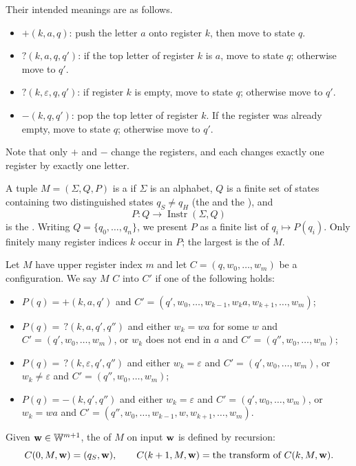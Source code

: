 \documentclass[a4paper]{scrartcl}
\newcommand{\WW}{\mathbb{W}}
\newcommand{\Instr}{\operatorname{Instr}}
\newcommand{\eps}{\varepsilon}
\begin{document}
Their intended meanings are as follows.
\begin{itemize}
	\item $+(k,a,q)$: push the letter $a$ onto register $k$, then move to state $q$.
	\item $?(k,a,q,q')$: if the top letter of register $k$ is $a$, move to state $q$; otherwise move to $q'$.
	\item $?(k,\eps,q,q')$: if register $k$ is empty, move to state $q$; otherwise move to $q'$.
	\item $-(k,q,q')$: pop the top letter of register $k$. If the register was already empty, move to state $q$; otherwise move to $q'$.
\end{itemize}
Note that only $+$ and $-$ change the registers, and each changes exactly one register by exactly one letter.

\begin{definition}
	A tuple $M = (\Sigma, Q, P)$ is a  if $\Sigma$ is an alphabet, $Q$ is a finite set of states containing two distinguished states $q_S \neq q_H$ (the  and the ), and
	$$P \colon Q \to \Instr(\Sigma, Q)$$
	is the . Writing $Q = \{q_0, \dots, q_n\}$, we present $P$ as a finite list of  $q_i \mapsto P(q_i)$. Only finitely many register indices $k$ occur in $P$; the largest is the  of $M$.
\end{definition}

\begin{definition}[Computation]
	Let $M$ have upper register index $m$ and let $C = (q, w_0, \dots, w_m)$ be a configuration. We say $M$  $C$ into $C'$ if one of the following holds:
	\begin{itemize}
		\item $P(q) = +(k,a,q')$ and $C' = (q', w_0, \dots, w_{k-1}, w_ka, w_{k+1}, \dots, w_m)$;
		\item $P(q) = \,?(k,a,q',q'')$ and either $w_k = wa$ for some $w$ and $C' = (q', w_0,\dots,w_m)$, or $w_k$ does not end in $a$ and $C' = (q'', w_0,\dots,w_m)$;
		\item $P(q) = \,?(k,\eps,q',q'')$ and either $w_k = \eps$ and $C' = (q', w_0,\dots,w_m)$, or $w_k \neq \eps$ and $C' = (q'',w_0,\dots,w_m)$;
		\item $P(q) = -(k,q',q'')$ and either $w_k = \eps$ and $C' = (q', w_0,\dots,w_m)$, or $w_k = wa$ and $C' = (q'', w_0,\dots,w_{k-1},w,w_{k+1},\dots,w_m)$.
	\end{itemize}
	Given $\vv{w} \in \WW^{m+1}$, the  of $M$ on input $\mathbf{w}$ is defined by recursion:
	$$C(0,M,\mathbf{w}) = (q_S, \mathbf{w}), \qquad C(k+1,M,\mathbf{w}) = \text{the transform of } C(k,M,\mathbf{w}).$$
\end{definition}
\end{document}
